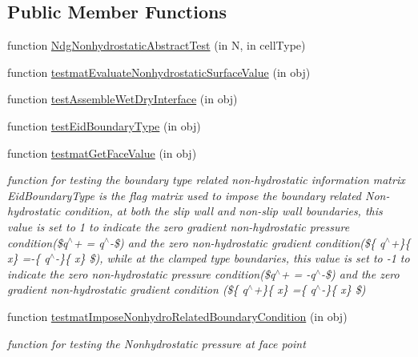 \subsection*{Public Member Functions}
\begin{DoxyCompactItemize}
\item 
function \hyperlink{class_ndg_nonhydrostatic_abstract_test_afdfe8a40820ecd745d5ea16249dfa08b}{Ndg\+Nonhydrostatic\+Abstract\+Test} (in N, in cell\+Type)
\item 
function \hyperlink{class_ndg_nonhydrostatic_abstract_test_adb76f62e03e412b79391b47662fbba67}{testmat\+Evaluate\+Nonhydrostatic\+Surface\+Value} (in obj)
\item 
function \hyperlink{class_ndg_nonhydrostatic_abstract_test_a5a27c1b76b339260188cc8cc3a47bcb8}{test\+Assemble\+Wet\+Dry\+Interface} (in obj)
\item 
function \hyperlink{class_ndg_nonhydrostatic_abstract_test_a85510ff3dbf5de105826408947136cb9}{test\+Eid\+Boundary\+Type} (in obj)
\item 
function \hyperlink{class_ndg_nonhydrostatic_abstract_test_a140557f2bf245f10dd6c548abf4fd4f2}{testmat\+Get\+Face\+Value} (in obj)
\begin{DoxyCompactList}\small\item\em function for testing the boundary type related non-\/hydrostatic information matrix Eid\+Boundary\+Type is the flag matrix used to impose the boundary related Non-\/hydrostatic condition, at both the slip wall and non-\/slip wall boundaries, this value is set to 1 to indicate the zero gradient non-\/hydrostatic pressure condition(\$q$^\wedge$+ = q$^\wedge$-\/\$) and the zero non-\/hydrostatic gradient condition(\$\{ q$^\wedge$+\}\{ x\} =-\/\{ q$^\wedge$-\/\}\{ x\} \$), while at the clamped type boundaries, this value is set to -\/1 to indicate the zero non-\/hydrostatic pressure condition(\$q$^\wedge$+ = -\/q$^\wedge$-\/\$) and the zero gradient non-\/hydrostatic gradient condition (\$\{ q$^\wedge$+\}\{ x\} =\{ q$^\wedge$-\/\}\{ x\} \$) \end{DoxyCompactList}\item 
function \hyperlink{class_ndg_nonhydrostatic_abstract_test_aa97093daf733e4cc4dc3ff15db9cec3c}{testmat\+Impose\+Nonhydro\+Related\+Boundary\+Condition} (in obj)
\begin{DoxyCompactList}\small\item\em function for testing the Nonhydrostatic pressure at face point \end{DoxyCompactList}\item 

\end{DoxyCompactItemize}
